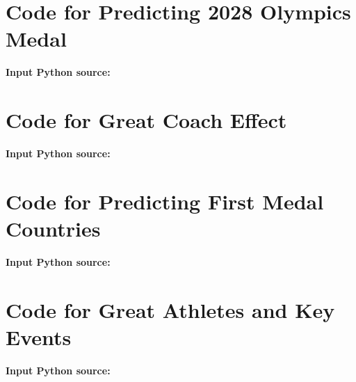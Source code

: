 \begin{appendices}

    \section{Code for Predicting 2028 Olympics Medal}

    \textbf{\textcolor[rgb]{0.98,0.00,0.00}{Input Python source:}}
    

    \section{Code for Great Coach Effect}

    \textbf{\textcolor[rgb]{0.98,0.00,0.00}{Input Python source:}}
    


    \section{Code for Predicting First Medal Countries}
    
    \textbf{\textcolor[rgb]{0.98,0.00,0.00}{Input Python source:}}
    



    \section{Code for Great Athletes and Key Events}
    \textbf{\textcolor[rgb]{0.98,0.00,0.00}{Input Python source:}}
    

    
\end{appendices}
    